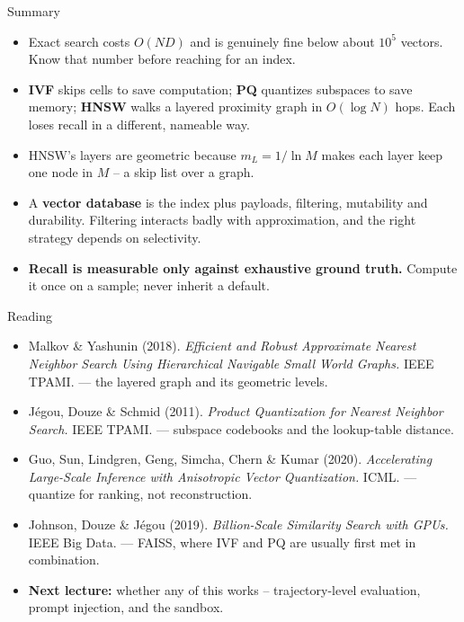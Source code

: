 \begin{frame}{Summary}
\begin{itemize}
  \item Exact search costs $O(ND)$ and is genuinely fine below about $10^5$ vectors. Know that number before reaching for an index.
  \pause
  \item \textbf{IVF} skips cells to save computation; \textbf{PQ} quantizes subspaces to save memory; \textbf{HNSW} walks a layered proximity graph in $O(\log N)$ hops. Each loses recall in a different, nameable way.
  \pause
  \item HNSW's layers are geometric because $m_L = 1/\ln M$ makes each layer keep one node in $M$ -- a skip list over a graph.
  \pause
  \item A \textbf{vector database} is the index plus payloads, filtering, mutability and durability. Filtering interacts badly with approximation, and the right strategy depends on selectivity.
  \pause
  \item \textbf{Recall is measurable only against exhaustive ground truth.} Compute it once on a sample; never inherit a default.
\end{itemize}
\end{frame}

\begin{frame}{Reading}
\begin{itemize}
  \item Malkov \& Yashunin (2018). \textit{Efficient and Robust Approximate Nearest Neighbor Search Using Hierarchical Navigable Small World Graphs.} IEEE TPAMI. --- the layered graph and its geometric levels.
  \pause
  \item J\'egou, Douze \& Schmid (2011). \textit{Product Quantization for Nearest Neighbor Search.} IEEE TPAMI. --- subspace codebooks and the lookup-table distance.
  \pause
  \item Guo, Sun, Lindgren, Geng, Simcha, Chern \& Kumar (2020). \textit{Accelerating Large-Scale Inference with Anisotropic Vector Quantization.} ICML. --- quantize for ranking, not reconstruction.
  \pause
  \item Johnson, Douze \& J\'egou (2019). \textit{Billion-Scale Similarity Search with GPUs.} IEEE Big Data. --- FAISS, where IVF and PQ are usually first met in combination.
  \pause
  \item \textbf{Next lecture:} whether any of this works -- trajectory-level evaluation, prompt injection, and the sandbox.
\end{itemize}
\end{frame}
